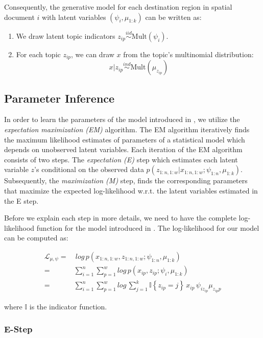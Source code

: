 Consequently, the generative model for each destination region in spatial document $i$ with latent variables $(\psi_i,\mu_{1:k})$ can be written as:
\begin{enumerate}
\item We draw latent topic indicators $z_{ip} \stackrel{iid}{\sim} \textrm{Mult}(\psi_i)$.
\item For each topic $z_{ip}$, we can draw $x$ from the topic's multinomial distribution:
\begin{equation*}
x \vert z_{ip} \stackrel{ind}{\sim} \textrm{Mult}(\mu_{z_{ip}})
\end{equation*}
\end{enumerate}

\subsection{Parameter Inference}

In order to learn the parameters of the model introduced in , we utilize the \emph{expectation maximization (EM)} algorithm. The EM algorithm iteratively finds the maximum likelihood estimates of parameters of a statistical model which depends on unobserved latent variables. Each iteration of the EM algorithm consists of two steps. The \emph{expectation (E)} step which estimates each latent variable $z$'s conditional on the observed data $p(z_{1:n,1:w}\vert x_{1:n,1:w};\psi_{1:n},\mu_{1:k})$. Subsequently, the \emph{maximization (M)} step, finds the corresponding parameters that maximize the expected log-likelihood w.r.t. the latent variables estimated in the E step.

Before we explain each step in more details, we need to have the complete log-likelihood function for the model introduced in . The log-likelihood for our model can be computed as:

\begin{align}
\mathcal{L}_{\mu,\psi} =&\:log\,p(x_{1:n,1:w}, z_{1:n,1:w};\psi_{1:n}, \mu_{1:k})\nonumber\\
=& \sum_{i=1}^n\sum_{p=1}^w log\,p(x_{ip}, z_{ip};\psi_i, \mu_{1:k}) \label{eq:likelihood}\\
=& \sum_{i=1}^n\sum_{p=1}^w log\,\sum_{j=1}^k \mathbb{I}\left\lbrace z_{ip} = j \right\rbrace\,x_{ip}\,\psi_{iz_{ip}}\mu_{z_{ip}p} \nonumber
\end{align}

where $\mathbb{I}$ is the indicator function.

\subsubsection{E-Step}

